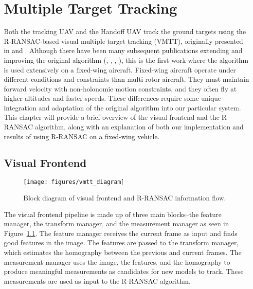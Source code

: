 \chapter{Multiple Target Tracking}
\label{ch:target_tracking}


Both the tracking UAV and the Handoff UAV track the ground targets using the R-RANSAC-based visual multiple target tracking (VMTT), originally presented in \cite{NiedfeldtBeard13} and \cite{Ingersoll15}. Although there have been many subsequent publications extending and improving the original algorithm
(\cite{DeFranco15}, \cite{IngersollNiedfeldtBeard__},
\cite{IngersollNiedfeldtBeard15}, \cite{NiedfeldtIngersollBeard17}),
this is the first work where the algorithm is used extensively on a fixed-wing aircraft. 
Fixed-wing aircraft operate under different conditions and constraints than multi-rotor aircraft. They must maintain forward velocity with non-holonomic motion constraints, and they often fly at higher altitudes and faster speeds. 
These differences require some unique integration and adaptation of the original algorithm into our particular system. 
This chapter will provide a brief overview of the visual frontend and the R-RANSAC algorithm, along with an explanation of both our implementation and results of using R-RANSAC on a fixed-wing vehicle.

\section{Visual Frontend}
\begin{figure}[hbt]
  \texttt{[image: figures/vmtt\_diagram]}
  \caption{Block diagram of visual frontend and R-RANSAC information flow.}
  \label{fig:vmtt_block}
\end{figure}
The visual frontend pipeline is made up of three main blocks--the feature manager, the transform manager, and the measurement manager as seen in Figure~\ref{fig:vmtt_block}. The feature manager receives the current frame as input and finds good features in the image. The features are passed to the transform manager, which estimates the homography between the previous and current frames. The measurement manager uses the image, the features, and the homography to produce meaningful measurements as candidates for new models to track. These measurements are used as input to the R-RANSAC algorithm.

